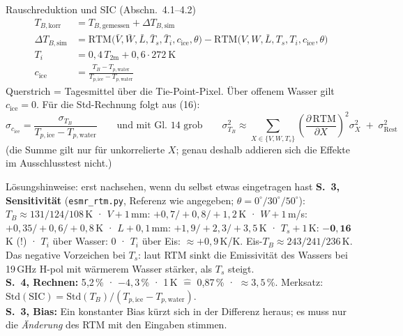 \documentclass[10pt,a4paper]{article}
\newcommand{\Tpw}{T_{p,\mathrm{water}}}
\newcommand{\Tpi}{T_{p,\mathrm{ice}}}
\newcommand{\cice}{c_{\mathrm{ice}}}
\newcommand{\dTB}{\Delta T_{B,\mathrm{sim}}}
\begin{document}
\begin{feld}{Rauschreduktion und SIC (Abschn.~4.1--4.2)}
\begin{align}
T_{B,\mathrm{korr}} &= T_{B,\mathrm{gemessen}} + \dTB \tag{13}\\[1mm]
\dTB &= \mathrm{RTM}\big(\bar V, \bar W, \bar L, \bar T_s, \bar T_i, \cice, \theta\big) - \mathrm{RTM}\big(V, W, \bar L, T_s, T_i, \cice, \theta\big) \tag{14}\\[1mm]
T_i &= 0{,}4\, T_{2\mathrm m} + 0{,}6 \cdot 272\ \mathrm K \tag{15}\\[1mm]
\cice &= \frac{T_{B} - \Tpw}{\Tpi - \Tpw} \tag{16}
\end{align}
{\footnotesize Querstrich = Tagesmittel über die Tie-Point-Pixel. Über offenem Wasser gilt \(\cice=0\). Für die Std-Rechnung folgt aus (16):}
\[
\sigma_{\cice} = \frac{\sigma_{T_B}}{\Tpi - \Tpw}
\qquad\text{und mit Gl.~14 grob}\qquad
\sigma_{T_B}^2 \approx \sum_{X\in\{V,W,T_s\}} \left(\frac{\partial\,\mathrm{RTM}}{\partial X}\right)^{\!2} \sigma_X^2 \;+\; \sigma_{\mathrm{Rest}}^2
\]
{\footnotesize (die Summe gilt nur für unkorrelierte \(X\); genau deshalb addieren sich die Effekte im Ausschlusstest nicht.)}
\end{feld}

\begin{strich}[fontupper=\footnotesize]{Lösungshinweise: erst nachsehen, wenn du selbst etwas eingetragen hast}
\textbf{S.~3, Sensitivität} (\texttt{esmr\_rtm.py}, Referenz wie angegeben; \(\theta = 0^\circ / 30^\circ / 50^\circ\)):
\(T_B \approx 131 / 124 / 108\)\,K · \(V{+}1\)\,mm: \(+0{,}7 / +0{,}8 / +1{,}2\)\,K · \(W{+}1\)\,m/s: \(+0{,}35 / +0{,}6 / +0{,}8\)\,K · \(L{+}0{,}1\)\,mm: \(+1{,}9 / +2{,}3 / +3{,}5\)\,K · \(T_s{+}1\)\,K: \(\mathbf{-0{,}16}\)\,K (!) · \(T_i\) über Wasser: 0 · \(T_i\) über Eis: \(\approx +0{,}9\)\,K/K. Eis-\(T_B \approx 243 / 241 / 236\)\,K.
Das negative Vorzeichen bei \(T_s\): laut RTM sinkt die Emissivität des Wassers bei 19\,GHz H-pol mit wärmerem Wasser stärker, als \(T_s\) steigt.\\
\textbf{S.~4, Rechnen:} 5{,}2\,\% · \(-4{,}3\)\,\% · 1\,K \(\widehat{=}\) 0{,}87\,\% · \(\approx 3{,}5\)\,\%. Merksatz: \(\mathrm{Std}(\mathrm{SIC}) = \mathrm{Std}(T_B)/(\Tpi-\Tpw)\).\\
\textbf{S.~3, Bias:} Ein konstanter Bias kürzt sich in der Differenz heraus; es muss nur die \emph{Änderung} des RTM mit den Eingaben stimmen.
\end{strich}
\end{document}
